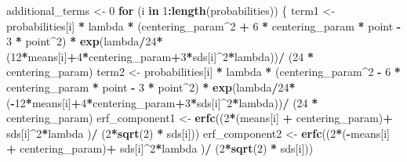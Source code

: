 \documentclass[
]{article}
\newenvironment{Shaded}{\begin{snugshade}}{\end{snugshade}}
\newcommand{\ControlFlowTok}[1]{\textcolor[rgb]{0.13,0.29,0.53}{\textbf{#1}}}
\newcommand{\DecValTok}[1]{\textcolor[rgb]{0.00,0.00,0.81}{#1}}
\newcommand{\FunctionTok}[1]{\textcolor[rgb]{0.13,0.29,0.53}{\textbf{#1}}}
\newcommand{\NormalTok}[1]{#1}
\newcommand{\OtherTok}[1]{\textcolor[rgb]{0.56,0.35,0.01}{#1}}
\newcommand{\SpecialCharTok}[1]{\textcolor[rgb]{0.81,0.36,0.00}{\textbf{#1}}}
\begin{document}
\begin{Shaded}
\begin{Highlighting}[]
\NormalTok{  additional\_terms }\OtherTok{\textless{}{-}} \DecValTok{0}
  \ControlFlowTok{for}\NormalTok{ (i }\ControlFlowTok{in} \DecValTok{1}\SpecialCharTok{:}\FunctionTok{length}\NormalTok{(probabilities)) \{}
\NormalTok{    term1 }\OtherTok{\textless{}{-}}\NormalTok{ probabilities[i] }\SpecialCharTok{*}\NormalTok{ lambda }\SpecialCharTok{*}
\NormalTok{      (centering\_param}\SpecialCharTok{\^{}}\DecValTok{2} \SpecialCharTok{+} \DecValTok{6} \SpecialCharTok{*}\NormalTok{ centering\_param }\SpecialCharTok{*}\NormalTok{ point }\SpecialCharTok{{-}} \DecValTok{3} \SpecialCharTok{*}\NormalTok{ point}\SpecialCharTok{\^{}}\DecValTok{2}\NormalTok{) }\SpecialCharTok{*}
      \FunctionTok{exp}\NormalTok{(lambda}\SpecialCharTok{/}\DecValTok{24}\SpecialCharTok{*}\NormalTok{(}\DecValTok{12}\SpecialCharTok{*}\NormalTok{means[i]}\SpecialCharTok{+}\DecValTok{4}\SpecialCharTok{*}\NormalTok{centering\_param}\SpecialCharTok{+}\DecValTok{3}\SpecialCharTok{*}\NormalTok{sds[i]}\SpecialCharTok{\^{}}\DecValTok{2}\SpecialCharTok{*}\NormalTok{lambda))}\SpecialCharTok{/}\NormalTok{ (}\DecValTok{24} \SpecialCharTok{*}\NormalTok{ centering\_param)}
\NormalTok{    term2 }\OtherTok{\textless{}{-}}\NormalTok{ probabilities[i] }\SpecialCharTok{*}\NormalTok{ lambda }\SpecialCharTok{*}
\NormalTok{      (centering\_param}\SpecialCharTok{\^{}}\DecValTok{2} \SpecialCharTok{{-}} \DecValTok{6} \SpecialCharTok{*}\NormalTok{ centering\_param }\SpecialCharTok{*}\NormalTok{ point }\SpecialCharTok{{-}} \DecValTok{3} \SpecialCharTok{*}\NormalTok{ point}\SpecialCharTok{\^{}}\DecValTok{2}\NormalTok{) }\SpecialCharTok{*}
      \FunctionTok{exp}\NormalTok{(lambda}\SpecialCharTok{/}\DecValTok{24}\SpecialCharTok{*}\NormalTok{(}\SpecialCharTok{{-}}\DecValTok{12}\SpecialCharTok{*}\NormalTok{means[i]}\SpecialCharTok{+}\DecValTok{4}\SpecialCharTok{*}\NormalTok{centering\_param}\SpecialCharTok{+}\DecValTok{3}\SpecialCharTok{*}\NormalTok{sds[i]}\SpecialCharTok{\^{}}\DecValTok{2}\SpecialCharTok{*}\NormalTok{lambda))}\SpecialCharTok{/}\NormalTok{ (}\DecValTok{24} \SpecialCharTok{*}\NormalTok{ centering\_param)}
\NormalTok{    erf\_component1 }\OtherTok{\textless{}{-}} \FunctionTok{erfc}\NormalTok{((}\DecValTok{2}\SpecialCharTok{*}\NormalTok{(means[i] }\SpecialCharTok{+}\NormalTok{ centering\_param)}\SpecialCharTok{+}\NormalTok{ sds[i]}\SpecialCharTok{\^{}}\DecValTok{2}\SpecialCharTok{*}\NormalTok{lambda )}\SpecialCharTok{/}\NormalTok{ (}\DecValTok{2}\SpecialCharTok{*}\FunctionTok{sqrt}\NormalTok{(}\DecValTok{2}\NormalTok{) }\SpecialCharTok{*}\NormalTok{ sds[i]))}
\NormalTok{    erf\_component2 }\OtherTok{\textless{}{-}} \FunctionTok{erfc}\NormalTok{((}\DecValTok{2}\SpecialCharTok{*}\NormalTok{(}\SpecialCharTok{{-}}\NormalTok{means[i] }\SpecialCharTok{+}\NormalTok{ centering\_param)}\SpecialCharTok{+}\NormalTok{ sds[i]}\SpecialCharTok{\^{}}\DecValTok{2}\SpecialCharTok{*}\NormalTok{lambda )}\SpecialCharTok{/}\NormalTok{ (}\DecValTok{2}\SpecialCharTok{*}\FunctionTok{sqrt}\NormalTok{(}\DecValTok{2}\NormalTok{) }\SpecialCharTok{*}\NormalTok{ sds[i]))}


\end{Highlighting}
\end{Shaded}
\end{document}
